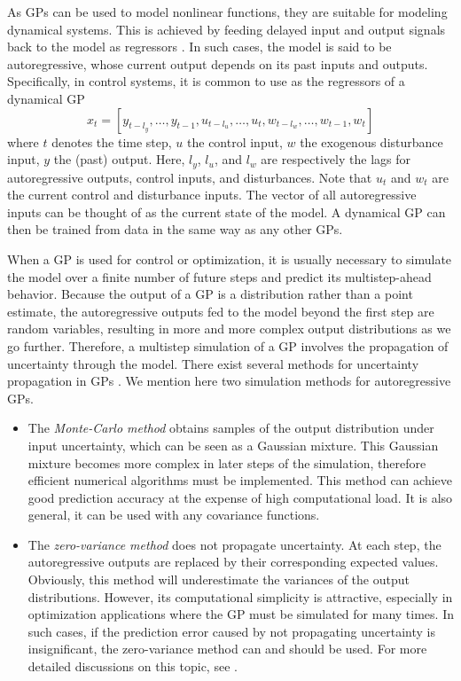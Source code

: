 As GPs can be used to model nonlinear functions, they are suitable for modeling dynamical systems.
This is achieved by feeding delayed input and output signals back to the model as regressors \cite{kocijan16modelling}.
In such cases, the model is said to be autoregressive, whose current output depends on its past inputs and outputs.
Specifically, in control systems, it is common to use as the regressors of a dynamical GP
\begin{equation*}
 x_t\!=\![y_{t-l_y}, \dots, y_{t-1}, u_{t-l_u}, \dots, u_t, w_{t-l_w}, \dots, w_{t-1}, w_t]
\end{equation*}
where \(t\) denotes the time step, \(u\) the control input, \(w\) the exogenous disturbance input, \(y\) the (past) output.
Here, \(l_y\), \(l_u\), and \(l_w\) are respectively the lags for autoregressive outputs, control inputs, and disturbances.
Note that \(u_t\) and \(w_t\) are the current control and disturbance inputs.
The vector of all autoregressive inputs can be thought of as the current state of the model.
A dynamical GP can then be trained from data in the same way as any other GPs.

When a GP is used for control or optimization, it is usually necessary to simulate the model over a finite number of future steps and predict its multistep-ahead behavior.
Because the output of a GP is a distribution rather than a point estimate, the autoregressive outputs fed to the model beyond the first step are random variables, resulting in more and more complex output distributions as we go further.
Therefore, a multistep simulation of a GP involves the propagation of uncertainty through the model.
There exist several methods for uncertainty propagation in GPs \cite{girard04approximate,kocijan16modelling}. 
We mention here two simulation methods for autoregressive GPs.
\begin{itemize}
\item The \emph{Monte-Carlo method} obtains samples of the output distribution under input uncertainty, which can be seen as a Gaussian mixture.  This Gaussian mixture becomes more complex in later steps of the simulation, therefore efficient numerical algorithms must be implemented.  This method can achieve good prediction accuracy at the expense of high computational load.  It is also general, \ie it can be used with any covariance functions.
\item The \emph{zero-variance method} does not propagate uncertainty.  At each step, the autoregressive outputs are replaced by their corresponding expected values.  Obviously, this method will underestimate the variances of the output distributions.  However, its computational simplicity is attractive, especially in optimization applications where the GP must be simulated for many times.  In such cases, if the prediction error caused by not propagating uncertainty is insignificant, the zero-variance method can and should be used.  For more detailed discussions on this topic, see \cite{kocijan16modelling,girard04approximate}.
\end{itemize}


